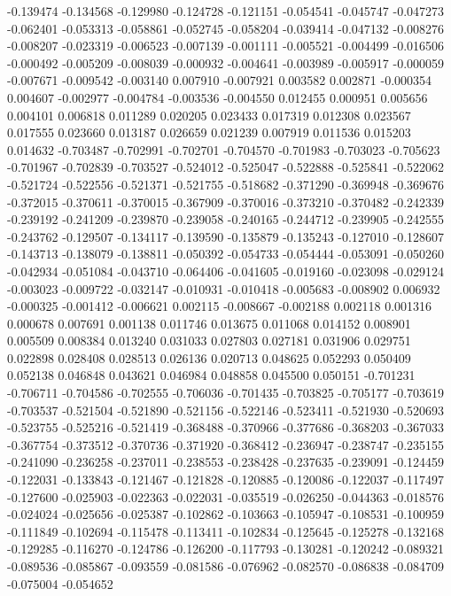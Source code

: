 -0.139474
-0.134568
-0.129980
-0.124728
-0.121151
-0.054541
-0.045747
-0.047273
-0.062401
-0.053313
-0.058861
-0.052745
-0.058204
-0.039414
-0.047132
-0.008276
-0.008207
-0.023319
-0.006523
-0.007139
-0.001111
-0.005521
-0.004499
-0.016506
-0.000492
-0.005209
-0.008039
-0.000932
-0.004641
-0.003989
-0.005917
-0.000059
-0.007671
-0.009542
-0.003140
0.007910
-0.007921
0.003582
0.002871
-0.000354
0.004607
-0.002977
-0.004784
-0.003536
-0.004550
0.012455
0.000951
0.005656
0.004101
0.006818
0.011289
0.020205
0.023433
0.017319
0.012308
0.023567
0.017555
0.023660
0.013187
0.026659
0.021239
0.007919
0.011536
0.015203
0.014632
-0.703487
-0.702991
-0.702701
-0.704570
-0.701983
-0.703023
-0.705623
-0.701967
-0.702839
-0.703527
-0.524012
-0.525047
-0.522888
-0.525841
-0.522062
-0.521724
-0.522556
-0.521371
-0.521755
-0.518682
-0.371290
-0.369948
-0.369676
-0.372015
-0.370611
-0.370015
-0.367909
-0.370016
-0.373210
-0.370482
-0.242339
-0.239192
-0.241209
-0.239870
-0.239058
-0.240165
-0.244712
-0.239905
-0.242555
-0.243762
-0.129507
-0.134117
-0.139590
-0.135879
-0.135243
-0.127010
-0.128607
-0.143713
-0.138079
-0.138811
-0.050392
-0.054733
-0.054444
-0.053091
-0.050260
-0.042934
-0.051084
-0.043710
-0.064406
-0.041605
-0.019160
-0.023098
-0.029124
-0.003023
-0.009722
-0.032147
-0.010931
-0.010418
-0.005683
-0.008902
0.006932
-0.000325
-0.001412
-0.006621
0.002115
-0.008667
-0.002188
0.002118
0.001316
0.000678
0.007691
0.001138
0.011746
0.013675
0.011068
0.014152
0.008901
0.005509
0.008384
0.013240
0.031033
0.027803
0.027181
0.031906
0.029751
0.022898
0.028408
0.028513
0.026136
0.020713
0.048625
0.052293
0.050409
0.052138
0.046848
0.043621
0.046984
0.048858
0.045500
0.050151
-0.701231
-0.706711
-0.704586
-0.702555
-0.706036
-0.701435
-0.703825
-0.705177
-0.703619
-0.703537
-0.521504
-0.521890
-0.521156
-0.522146
-0.523411
-0.521930
-0.520693
-0.523755
-0.525216
-0.521419
-0.368488
-0.370966
-0.377686
-0.368203
-0.367033
-0.367754
-0.373512
-0.370736
-0.371920
-0.368412
-0.236947
-0.238747
-0.235155
-0.241090
-0.236258
-0.237011
-0.238553
-0.238428
-0.237635
-0.239091
-0.124459
-0.122031
-0.133843
-0.121467
-0.121828
-0.120885
-0.120086
-0.122037
-0.117497
-0.127600
-0.025903
-0.022363
-0.022031
-0.035519
-0.026250
-0.044363
-0.018576
-0.024024
-0.025656
-0.025387
-0.102862
-0.103663
-0.105947
-0.108531
-0.100959
-0.111849
-0.102694
-0.115478
-0.113411
-0.102834
-0.125645
-0.125278
-0.132168
-0.129285
-0.116270
-0.124786
-0.126200
-0.117793
-0.130281
-0.120242
-0.089321
-0.089536
-0.085867
-0.093559
-0.081586
-0.076962
-0.082570
-0.086838
-0.084709
-0.075004
-0.054652
